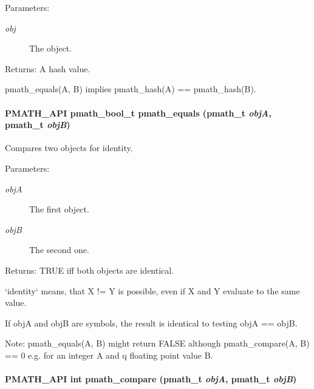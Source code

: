 \begin{Desc}
\item[Parameters:]
\begin{description}
\item[{\em obj}]The object. \end{description}
\end{Desc}
\begin{Desc}
\item[Returns:]A hash value.\end{Desc}
pmath\_\-equals(A, B) implies pmath\_\-hash(A) == pmath\_\-hash(B). \hypertarget{group__objects_g6475af7f7c85777392e38c570ac07892}{
\paragraph[{pmath\_\-equals}]{\setlength{\rightskip}{0pt plus 5cm}PMATH\_\-API {\bf pmath\_\-bool\_\-t} pmath\_\-equals ({\bf pmath\_\-t} {\em objA}, \/  {\bf pmath\_\-t} {\em objB})}\hfill}
\label{group__objects_g6475af7f7c85777392e38c570ac07892}


Compares two objects for identity. 

\begin{Desc}
\item[Parameters:]
\begin{description}
\item[{\em objA}]The first object. \item[{\em objB}]The second one. \end{description}
\end{Desc}
\begin{Desc}
\item[Returns:]TRUE iff both objects are identical.\end{Desc}
`identity` means, that X != Y is possible, even if X and Y evaluate to the same value.

If objA and objB are symbols, the result is identical to testing objA == objB.

\begin{Desc}
\item[Note:]pmath\_\-equals(A, B) might return FALSE although pmath\_\-compare(A, B) == 0 e.g. for an integer A and q floating point value B. \end{Desc}
\hypertarget{group__objects_gc57589e08f5b3eed28e724c646503735}{
\paragraph[{pmath\_\-compare}]{\setlength{\rightskip}{0pt plus 5cm}PMATH\_\-API int pmath\_\-compare ({\bf pmath\_\-t} {\em objA}, \/  {\bf pmath\_\-t} {\em objB})}\hfill}
\label{group__objects_gc57589e08f5b3eed28e724c646503735}


